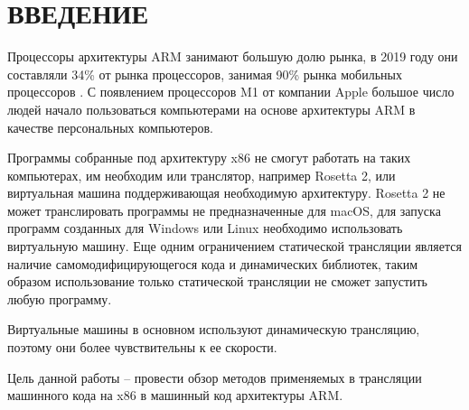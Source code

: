 \section*{ВВЕДЕНИЕ}

Процессоры архитектуры ARM занимают большую долю рынка, в 2019 году они составляли 34\% от рынка процессоров, занимая 90\% рынка мобильных процессоров \cite{arm_report}.  С появлением процессоров M1 от компании Apple большое число людей начало пользоваться компьютерами на основе архитектуры ARM в качестве персональных компьютеров. 

Программы собранные под архитектуру x86 не смогут работать на таких компьютерах, им необходим или транслятор, например Rosetta 2, или виртуальная машина поддерживающая необходимую архитектуру. Rosetta 2 не может транслировать программы не предназначенные для macOS, для запуска программ созданных для Windows или Linux необходимо использовать виртуальную машину. Еще одним ограничением статической трансляции является наличие самомодифицирующегося кода и динамических библиотек, таким образом использование только статической трансляции не сможет запустить любую программу. \cite{fast_bin}

Виртуальные машины в основном используют динамическую трансляцию, поэтому они более чувствительны к ее скорости.

Цель данной работы – провести обзор методов применяемых в трансляции машинного кода на x86 в машинный код архитектуры ARM.

\pagebreak